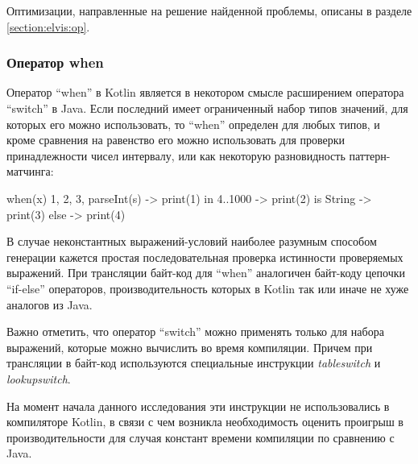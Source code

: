Оптимизации, направленные на решение найденной проблемы, описаны в разделе \ref{section:elvis:op}.

\subsubsection{Оператор when}
\label{section:when:bm}
Оператор ``when'' в Kotlin является в некотором смысле расширением оператора ``switch'' в Java.
Если последний имеет ограниченный набор типов значений, для которых его можно использовать, то
``when'' определен для любых типов, и кроме сравнения на равенство его можно использовать для
проверки принадлежности чисел интервалу, или как некоторую разновидность паттерн-матчинга:

\begin{pyglist}[language=kotlin]
    when(x) {
        1, 2, 3, parseInt(s) -> print(1)
        in 4..1000 -> print(2)
        is String -> print(3)
        else -> print(4)
    }
\end{pyglist}
В случае неконстантных выражений-условий наиболее разумным способом генерации кажется простая
последовательная проверка истинности проверяемых выражений.
При трансляции байт-код для ``when'' аналогичен байт-коду цепочки ``if-else'' операторов,
производительность которых в Kotlin так или иначе не хуже аналогов из Java.

Важно отметить, что оператор ``switch'' можно применять только для набора выражений, которые можно
вычислить во время компиляции.
Причем при трансляции в байт-код используются специальные инструкции \textit{tableswitch} и
\textit{lookupswitch}\cite{JVMSpec}.

На момент начала данного исследования эти инструкции не использовались в компиляторе Kotlin,
в связи с чем возникла необходимость оценить проигрыш в производительности для случая констант
времени компиляции по сравнению с Java.

